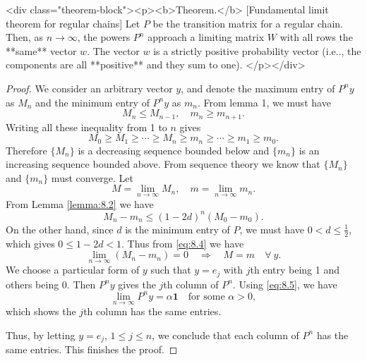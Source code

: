 <div class="theorem-block"><p><b>Theorem.</b> [Fundamental limit theorem for regular chains]
\label{thm:8.1}
Let $P$ be the transition matrix for a regular chain. Then, as $n \to \infty$, the powers $P^n$ approach a limiting matrix $W$ with all rows the **same** vector $w$. The vector $w$ is a strictly positive probability vector (i.e.., the components are all **positive** and they sum to one).
</p></div>

\begin{proof}
We consider an arbitrary vector $y$, and denote the maximum entry of $P^n y$ as $M_n$ and the minimum entry of $P^n y$ as $m_n$. From lemma 1, we must have 
$$\begin{equation}
    M_n \leq M_{n-1}, \quad m_n \geq m_{n+1}.
\end{equation}$$
Writing all these inequality from 1 to $n$ gives
$$\begin{equation}
    M_0 \geq M_1 \geq \cdots \geq M_n \geq m_n \geq \cdots \geq m_1 \geq m_0.
\end{equation}$$
Therefore $\{M_n\}$ is a decreasing sequence bounded below and $\{m_n\}$ is an increasing sequence bounded above. From sequence theory we know that $\{ M_n \}$ and $\{m_n\}$ must converge. Let
$$\begin{equation}
    M = \lim_{n\to\infty} M_n, \quad m = \lim_{n\to\infty} m_n.
\end{equation}$$
From Lemma \ref{lemma:8.2} we have 
$$$$$$$$$$\begin{equation}
    \label{eq:8.4}
    \tag{8-4}
    M_n - m_n \leq (1-2d)^n (M_0 - m_0).
\end{equation}$$$$$$$$$$
On the other hand, since $d$ is the minimum entry of $P$, we must have $0 < d \leq \frac{1}{2}$, which gives $0 \leq 1-2d < 1$. Thus from \eqref{eq:8.4} we have 
$$$$$$$$$$\begin{equation}
    \label{eq:8.5}
    \tag{8-5}
    \lim_{n\to\infty} (M_n - m_n) = 0 \quad \Rightarrow \quad 
    M=m \quad \forall \ y.
\end{equation}$$$$$$$$$$
We choose a particular form of $y$ such that $y = e_j$ with $j$th entry being 1 and others being 0. Then $P^n y$ gives the $j$th column of $P^n$. Using \eqref{eq:8.5}, we have
$$\begin{equation}
    \lim_{n\to\infty} P^n y = \alpha \mathbf{1} \quad \text{for some $\alpha > 0$},
\end{equation}$$
which shows the $j$th column has the same entries.

Thus, by letting $y = e_j$, $1\leq j \leq n$, we conclude that each column of $P^n$ has the same entries. This finishes the proof.
\end{proof}

